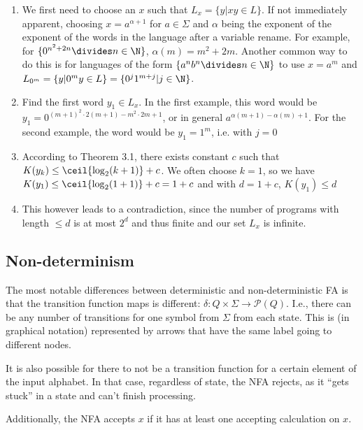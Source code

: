 \begin{enumerate}[noitemsep]
    \item We first need to choose an $x$ such that $L_x = \{ y | xy \in L \}$.
          If not immediately apparent, choosing $x = a^{\alpha + 1}$ for $a \in \Sigma$
          and $\alpha$ being the exponent of the exponent of the words in the language after a variable rename.
          For example, for $\{ 0^{n^2 + 2n} \divides n \in \N \}$, $\alpha(m) = m^2 + 2m$.
          Another common way to do this is for languages of the form $\{ a^n b^n \divides n \in \N \}$ to use $x = a^m$ and
          $L_{0^m} = \{ y | 0^m y \in L \} = \{ 0^j 1^{m + j} | j \in \N \}$.
    \item Find the first word $y_1 \in L_x$. In the first example, this word would be $y_1 = 0^{(m + 1)^2 \cdot 2(m + 1) - m^2 \cdot 2m + 1}$,
          or in general $a^{\alpha(m + 1) - \alpha(m) + 1}$.
          For the second example, the word would be $y_1 = 1^m$, i.e. with $j = 0$
    \item According to Theorem 3.1, there exists constant $c$ such that $K(y_k) \leq \ceil{\log_2(k + 1)} + c$. We often choose $k = 1$,
          so we have $K(y_1) \leq \ceil{\log_2(1 + 1)} + c = 1 + c$ and with $d = 1 + c$, $K(y_1) \leq d$
    \item This however leads to a contradiction, since the number of programs with length $\leq d$ is at most $2^d$ and thus finite and our set $L_x$ is infinite.
\end{enumerate}


\subsection{Non-determinism}
The most notable differences between deterministic and non-deterministic FA is that the transition function maps is different: $\delta: Q \times \Sigma \rightarrow \mathcal{P}(Q)$.
I.e., there can be any number of transitions for one symbol from $\Sigma$ from each state.
This is (in graphical notation) represented by arrows that have the same label going to different nodes.

It is also possible for there to not be a transition function for a certain element of the input alphabet.
In that case, regardless of state, the NFA rejects, as it ``gets stuck'' in a state and can't finish processing.

Additionally, the NFA accepts $x$ if it has at least one accepting calculation on $x$.

